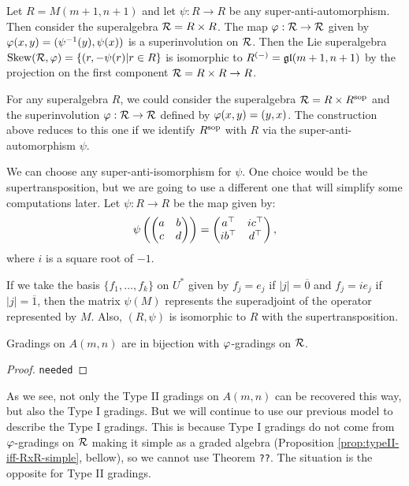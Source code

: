 \documentclass{amsbook}
\begin{document}
Let $R = M(m+1, n+1)$ and let $\psi: R\to R$ be any super-anti-automorphism. Then consider the superalgebra $\mathcal R = R\times R$. The map $\varphi: \mathcal R \to \mathcal R$ given by $\varphi(x,y) = (\psi^{-1}(y), \psi(x))$ is a superinvolution on $\mathcal R$. Then the Lie superalgebra $\operatorname{Skew} (\mathcal R, \varphi) = \{(r, -\psi(r) | r\in R\}$ is isomorphic to $R^{(-)} = \mathfrak{gl}(m+1, n+1)$ by the projection on the first component $\mathcal R = R\times R \to R$.

\begin{remark}
    For any superalgebra $R$, we could consider the superalgebra $\mathcal R = R \times R^{\mathrm{sop}}$ and the superinvolution $\varphi: \mathcal R \to \mathcal R$ defined by $\varphi(x, y) = (y, x)$. The construction above reduces to this one if we identify $R^{\mathrm{sop}}$ with $R$ via the super-anti-automorphism $\psi$. 
\end{remark}

We can choose any super-anti-isomorphism for $\psi$. One choice would be the supertransposition, but we are going to use a different one that will simplify some computations later. Let $\psi: R \to R$ be the map given by:
\[
    \psi\left(
    \begin{pmatrix}
        a & b\\
        c & d
    \end{pmatrix}\right) = 
    \begin{pmatrix}
        a^{\top} & i c^{\top}\\
        i b^{\top} & d^{\top}
    \end{pmatrix},
\]
where $i$ is a square root of $-1$.

\begin{remark}
    If we take the basis $\{f_1, \ldots, f_k\}$ on $U^*$ given by $f_j = e_j $ if $|j| = \overline 0$ and $f_j = ie_j$ if $|j| = \overline 1$, then the matrix $\psi (M)$ represents the superadjoint of the operator represented by $M$. Also, $(R, \psi)$ is isomorphic to $R$ with the supertransposition.
\end{remark}

\begin{prop}
    Gradings on $A(m,n)$ are in bijection with $\varphi$-gradings on $\mathcal R$.
\end{prop}

\begin{proof}
    {\tt needed}
\end{proof}

As we see, not only the Type II gradings on $A(m,n)$ can be recovered this way, but also the Type I gradings. But we will continue to use our previous model to describe the Type I gradings. This is because Type I gradings do not come from $\varphi$-gradings on $\mathcal R$ making it simple as a graded algebra (Proposition \ref{prop:typeII-iff-RxR-simple}, bellow), so we cannot use Theorem {\tt ??}. The situation is the opposite for Type II gradings.
\end{document}
